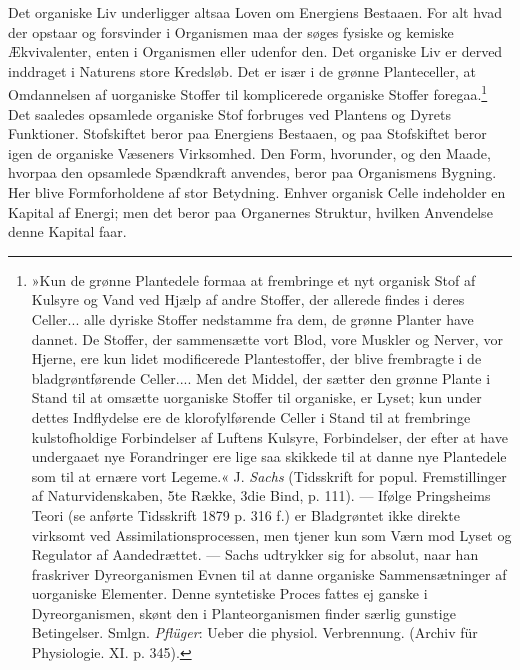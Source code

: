 \documentclass[12pt,a4paper,openany]{book}
\newcommand{\opage}[1]{\marginnote{\footnotesize\textit{[#1]}}}
\begin{document}
Det organiske Liv underligger altsaa Loven om Energiens Bestaaen. For
alt hvad der opstaar og forsvinder i Organismen maa der søges fysiske og
kemiske Ækvivalenter, enten i Organismen eller udenfor den. Det
organiske Liv er derved inddraget i Naturens store Kredsløb. Det er især
i de grønne Planteceller, at Omdannelsen af uorganiske Stoffer til
komplicerede organiske Stoffer foregaa.\footnote[2]{»Kun de grønne
Plantedele formaa at frembringe et nyt organisk Stof af Kulsyre og Vand
ved Hjælp af andre Stoffer, der allerede findes i deres Celler... alle
dyriske Stoffer nedstamme fra dem, de grønne Planter have dannet. De
Stoffer, der sammensætte vort Blod, vore Muskler og Nerver, vor Hjerne,
ere kun lidet modificerede Plantestoffer, der blive frembragte i de
bladgrøntførende Celler.... Men det Middel, der sætter den grønne Plante
i Stand til at omsætte uorganiske Stoffer til organiske, er Lyset; kun
under dettes Indflydelse ere de klorofylførende Celler i Stand til at
frembringe kulstofholdige Forbindelser af Luftens Kulsyre, Forbindelser,
der efter at have undergaaet nye Forandringer ere lige saa skikkede til
at danne nye Plantedele som til at ernære vort Legeme.« J. \emph{Sachs}
(Tidsskrift for popul. Fremstillinger af Naturvidenskaben, 5te Række,
3die Bind, p. 111). --- Ifølge Pringsheims Teori (se anførte Tidsskrift
1879 p. 316 f.) er Bladgrøntet ikke direkte virksomt ved
Assimilationsprocessen, men tjener kun som Værn mod Lyset og Regulator
af Aandedrættet. --- Sachs udtrykker sig for absolut, naar han
fraskriver Dyreorganismen Evnen til at danne organiske Sammensætninger
af uorganiske Elementer. Denne syntetiske Proces fattes ej ganske i
Dyreorganismen, skønt den i Planteorganismen finder særlig gunstige
Betingelser. Smlgn. \emph{Pflüger}: Ueber die physiol. Verbrennung.
(Archiv für Physiologie. XI. p. 345).} Det saaledes opsamlede
\opage{43}organiske Stof forbruges ved Plantens og Dyrets Funktioner.
Stofskiftet beror paa Energiens Bestaaen, og paa Stofskiftet beror igen
de organiske Væseners Virksomhed. Den Form, hvorunder, og den Maade,
hvorpaa den opsamlede Spændkraft anvendes, beror paa Organismens
Bygning. Her blive Formforholdene af stor Betydning. Enhver organisk
Celle indeholder en Kapital af Energi; men det beror paa Organernes
Struktur, hvilken Anvendelse denne Kapital faar.
\end{document}
